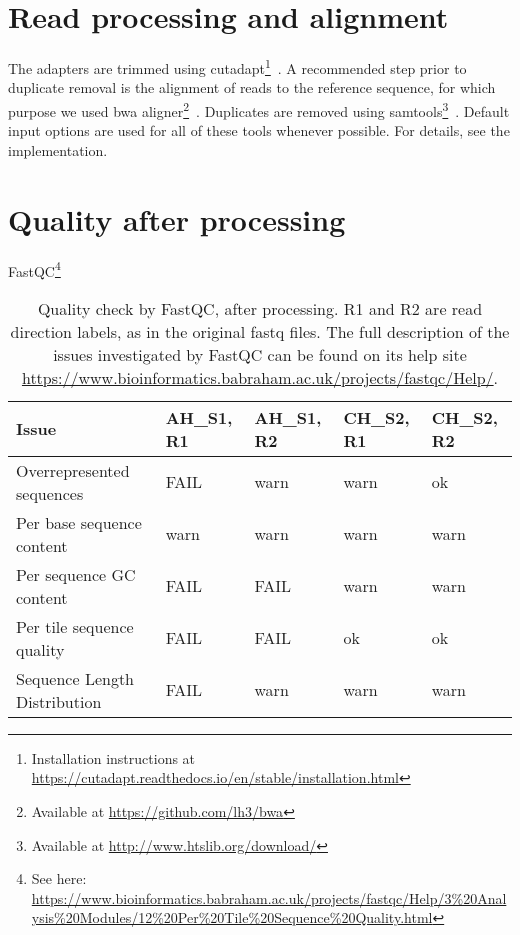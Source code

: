 \documentclass[fleqn]{scrartcl}%
\begin{document}
\section{Read processing and alignment}
The adapters are trimmed using
cutadapt\footnote{Installation instructions at
\url{https://cutadapt.readthedocs.io/en/stable/installation.html}}~\cite{martin2011cutadapt}.
%
A recommended step prior to duplicate removal is the alignment of reads to the reference
sequence, for which purpose we used
bwa aligner\footnote{Available at \url{https://github.com/lh3/bwa}}~\cite{li2010fast}.
%
Duplicates are removed using
samtools\footnote{Available at \url{http://www.htslib.org/download/}}~\cite{li2009sequence}.
Default input options are used for all of these tools whenever possible. For details,
see the implementation.




\section{Quality after processing}

FastQC\footnote{See here:
\url{https://www.bioinformatics.babraham.ac.uk/projects/fastqc/Help/3\%20Analysis\%20Modules/12\%20Per\%20Tile\%20Sequence\%20Quality.html}}

\begin{table}[ht]
	\begin{tabular}{ |l||l |l |l |l |  }
		\hline
		Issue & AH\_S1, R1  & AH\_S1, R2   & CH\_S2, R1  & CH\_S2, R2 \\
		\hline
		Overrepresented sequences & FAIL  & warn  & warn  & ok \\
		Per base sequence content & warn  & warn  & warn  & warn \\
		Per sequence GC content & FAIL  & FAIL  & warn  & warn \\
		Per tile sequence quality & FAIL  & FAIL  & ok  & ok \\
		Sequence Length Distribution & FAIL  & warn  & warn  & warn \\
		\hline
	\end{tabular}
	\caption{Quality check by FastQC,  after processing. R1 and R2 are read direction labels, as in
	the original fastq files. The full description of the issues investigated by FastQC can be found
	 on its help site  \url{https://www.bioinformatics.babraham.ac.uk/projects/fastqc/Help/}.}
	\label{table:after}
\end{table}
\end{document}

